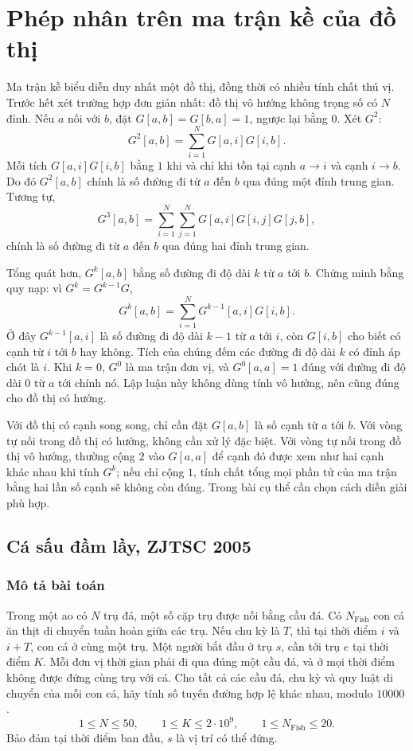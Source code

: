 \documentclass[11pt]{article}
\begin{document}
\section{Phép nhân trên ma trận kề của đồ thị}

Ma trận kề biểu diễn duy nhất một đồ thị, đồng thời có nhiều tính chất thú vị.
Trước hết xét trường hợp đơn giản nhất: đồ thị vô hướng không trọng số có
\(N\) đỉnh. Nếu \(a\) nối với \(b\), đặt \(G[a,b]=G[b,a]=1\), ngược lại bằng
\(0\). Xét \(G^2\):
\[
  G^2[a,b]=\sum_{i=1}^{N}G[a,i]G[i,b].
\]
Mỗi tích \(G[a,i]G[i,b]\) bằng \(1\) khi và chỉ khi tồn tại cạnh \(a\to i\) và
cạnh \(i\to b\). Do đó \(G^2[a,b]\) chính là số đường đi từ \(a\) đến \(b\)
qua đúng một đỉnh trung gian. Tương tự,
\[
  G^3[a,b]=\sum_{i=1}^{N}\sum_{j=1}^{N}G[a,i]G[i,j]G[j,b],
\]
chính là số đường đi từ \(a\) đến \(b\) qua đúng hai đỉnh trung gian.

Tổng quát hơn, \(G^k[a,b]\) bằng số đường đi độ dài \(k\) từ \(a\) tới \(b\).
Chứng minh bằng quy nạp: vì \(G^k=G^{k-1}G\),
\[
  G^k[a,b]=\sum_{i=1}^{N}G^{k-1}[a,i]G[i,b].
\]
Ở đây \(G^{k-1}[a,i]\) là số đường đi độ dài \(k-1\) từ \(a\) tới \(i\), còn
\(G[i,b]\) cho biết có cạnh từ \(i\) tới \(b\) hay không. Tích của chúng đếm
các đường đi độ dài \(k\) có đỉnh áp chót là \(i\). Khi \(k=0\), \(G^0\) là ma
trận đơn vị, và \(G^0[a,a]=1\) đúng với đường đi độ dài \(0\) từ \(a\) tới
chính nó. Lập luận này không dùng tính vô hướng, nên cũng đúng cho đồ thị có
hướng.

Với đồ thị có cạnh song song, chỉ cần đặt \(G[a,b]\) là số cạnh từ \(a\) tới
\(b\). Với vòng tự nối trong đồ thị có hướng, không cần xử lý đặc biệt. Với
vòng tự nối trong đồ thị vô hướng, thường cộng \(2\) vào \(G[a,a]\) để cạnh đó
được xem như hai cạnh khác nhau khi tính \(G^k\); nếu chỉ cộng \(1\), tính chất
tổng mọi phần tử của ma trận bằng hai lần số cạnh sẽ không còn đúng. Trong bài
cụ thể cần chọn cách diễn giải phù hợp.

\subsection{Cá sấu đầm lầy, ZJTSC 2005}

\subsubsection{Mô tả bài toán}

Trong một ao có \(N\) trụ đá, một số cặp trụ được nối bằng cầu đá. Có
\(N_{\text{Fish}}\) con cá ăn thịt di chuyển tuần hoàn giữa các trụ. Nếu chu
kỳ là \(T\), thì tại thời điểm \(i\) và \(i+T\), con cá ở cùng một trụ. Một
người bắt đầu ở trụ \(s\), cần tới trụ \(e\) tại thời điểm \(K\). Mỗi đơn vị
thời gian phải đi qua đúng một cầu đá, và ở mọi thời điểm không được đứng cùng
trụ với cá. Cho tất cả các cầu đá, chu kỳ và quy luật di chuyển của mỗi con
cá, hãy tính số tuyến đường hợp lệ khác nhau, modulo \(10000\).
\[
  1\le N\le 50,\qquad 1\le K\le 2\cdot 10^9,\qquad
  1\le N_{\text{Fish}}\le 20.
\]
Bảo đảm tại thời điểm ban đầu, \(s\) là vị trí có thể đứng.
\end{document}
